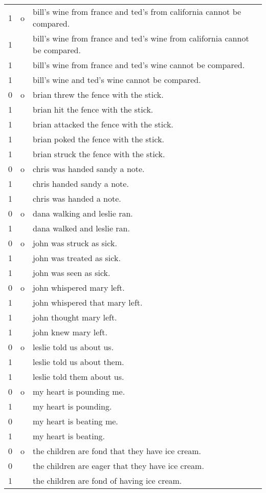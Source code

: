\begin{center}
\begin{longtable}{p{0.5cm}p{0.5cm}p{15cm}}
1 & o & bill's wine from france and ted's from california cannot be compared. \\
1 &   & bill's wine from france and ted's wine from california cannot be compared. \\
1 &   & bill's wine from france and ted's wine cannot be compared. \\
1 &   & bill's wine and ted's wine cannot be compared. \\
0 & o & brian threw the fence with the stick. \\
1 &   & brian hit the fence with the stick. \\
1 &   & brian attacked the fence with the stick. \\
1 &   & brian poked the fence with the stick. \\
1 &   & brian struck the fence with the stick. \\
0 & o & chris was handed sandy a note. \\
1 &   & chris handed sandy a note. \\
1 &   & chris was handed a note. \\
0 & o & dana walking and leslie ran. \\
1 &   & dana walked and leslie ran. \\
0 & o & john was struck as sick. \\
1 &   & john was treated as sick. \\
1 &   & john was seen as sick. \\
0 & o & john whispered mary left. \\
1 &   & john whispered that mary left. \\
1 &   & john thought mary left. \\
1 &   & john knew mary left. \\
0 & o & leslie told us about us. \\
1 &   & leslie told us about them. \\
1 &   & leslie told them about us. \\
0 & o & my heart is pounding me. \\
1 &   & my heart is pounding. \\
0 &   & my heart is beating me. \\
1 &   & my heart is beating. \\
0 & o & the children are fond that they have ice cream. \\
0 &   & the children are eager that they have ice cream. \\
1 &   & the children are fond of having ice cream. \\

\end{longtable}
\end{center}
